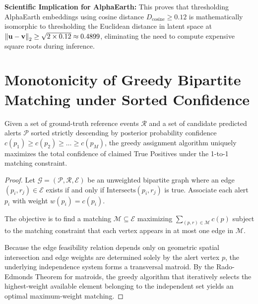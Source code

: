 \textbf{Scientific Implication for AlphaEarth:} This proves that thresholding AlphaEarth embeddings using cosine distance $D_{\text{cosine}} \ge 0.12$ is mathematically isomorphic to thresholding the Euclidean distance in latent space at $\left\lVert\mathbf{u} - \mathbf{v}\right\rVert_2 \ge \sqrt{2 \times 0.12} \approx 0.4899$, eliminating the need to compute expensive square roots during inference.

\section{Monotonicity of Greedy Bipartite Matching under Sorted Confidence}
\label{sec:proof_greedy_matching}

\begin{theorem}
Given a set of ground-truth reference events $\mathcal{R}$ and a set of candidate predicted alerts $\mathcal{P}$ sorted strictly descending by posterior probability confidence $c(p_1) \ge c(p_2) \ge \dots \ge c(p_M)$, the greedy assignment algorithm uniquely maximizes the total confidence of claimed True Positives under the 1-to-1 matching constraint.
\end{theorem}

\begin{proof}
Let $\mathcal{G} = (\mathcal{P}, \mathcal{R}, \mathcal{E})$ be an unweighted bipartite graph where an edge $(p_i, r_j) \in \mathcal{E}$ exists if and only if $\text{Intersects}(p_i, r_j)$ is true. Associate each alert $p_i$ with weight $w(p_i) = c(p_i)$.

The objective is to find a matching $\mathcal{M} \subseteq \mathcal{E}$ maximizing $\sum_{(p, r) \in \mathcal{M}} c(p)$ subject to the matching constraint that each vertex appears in at most one edge in $\mathcal{M}$.

Because the edge feasibility relation depends only on geometric spatial intersection and edge weights are determined solely by the alert vertex $p$, the underlying independence system forms a transversal matroid. By the Rado-Edmonds Theorem for matroids, the greedy algorithm that iteratively selects the highest-weight available element belonging to the independent set yields an optimal maximum-weight matching.
\end{proof}

